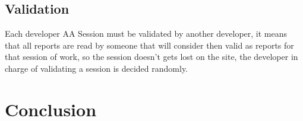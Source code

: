 \documentclass[letterpaper]{article}
\begin{document}
\subsection{Validation}

Each developer AA Session must be validated by another developer, it means that
all reports are read by someone that will consider then valid as reports for
that session of work, so the session doesn't gets lost on the site, the
developer in charge of validating a session is decided randomly.


\section{Conclusion}


%
%


\end{document}
